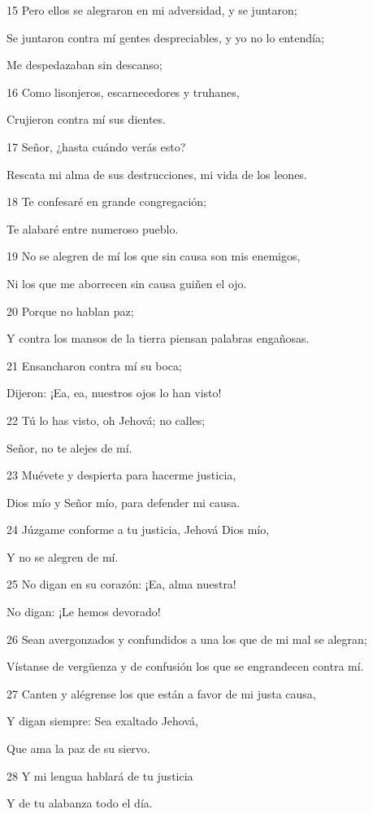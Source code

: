 \par 15 Pero ellos se alegraron en mi adversidad, y se juntaron;
\par Se juntaron contra mí gentes despreciables, y yo no lo entendía;
\par Me despedazaban sin descanso;
\par 16 Como lisonjeros, escarnecedores y truhanes,
\par Crujieron contra mí sus dientes.
\par 17 Señor, ¿hasta cuándo verás esto?
\par Rescata mi alma de sus destrucciones, mi vida de los leones.
\par 18 Te confesaré en grande congregación;
\par Te alabaré entre numeroso pueblo.
\par 19 No se alegren de mí los que sin causa son mis enemigos,
\par Ni los que me aborrecen sin causa guiñen el ojo.
\par 20 Porque no hablan paz;
\par Y contra los mansos de la tierra piensan palabras engañosas.
\par 21 Ensancharon contra mí su boca;
\par Dijeron: ¡Ea, ea, nuestros ojos lo han visto!
\par 22 Tú lo has visto, oh Jehová; no calles;
\par Señor, no te alejes de mí.
\par 23 Muévete y despierta para hacerme justicia,
\par Dios mío y Señor mío, para defender mi causa.
\par 24 Júzgame conforme a tu justicia, Jehová Dios mío,
\par Y no se alegren de mí.
\par 25 No digan en su corazón: ¡Ea, alma nuestra!
\par No digan: ¡Le hemos devorado!
\par 26 Sean avergonzados y confundidos a una los que de mi mal se alegran;
\par Vístanse de vergüenza y de confusión los que se engrandecen contra mí.
\par 27 Canten y alégrense los que están a favor de mi justa causa,
\par Y digan siempre: Sea exaltado Jehová,
\par Que ama la paz de su siervo.
\par 28 Y mi lengua hablará de tu justicia
\par Y de tu alabanza todo el día.

